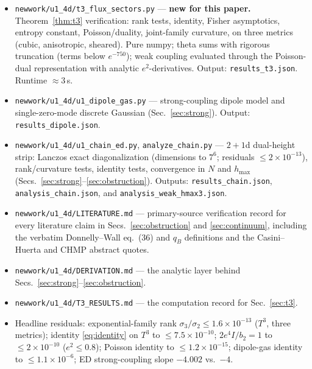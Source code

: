 \documentclass[11pt]{article}
\theoremstyle{remark}
\theoremstyle{plain}
\begin{document}
\begin{itemize}
\item \texttt{newwork/u1\_4d/t3\_flux\_sectors.py} --- \textbf{new for this paper.} Theorem~\ref{thm:t3} verification: rank tests, identity, Fisher asymptotics, entropy constant, Poisson/duality, joint-family curvature, on three metrics (cubic, anisotropic, sheared). Pure numpy; theta sums with rigorous truncation (terms below $e^{-750}$); weak coupling evaluated through the Poisson-dual representation with analytic $e^2$-derivatives. Output: \texttt{results\_t3.json}. Runtime ${\approx}3$\,s.
\item \texttt{newwork/u1\_4d/u1\_dipole\_gas.py} --- strong-coupling dipole model and single-zero-mode discrete Gaussian (Sec.~\ref{sec:strong}). Output: \texttt{results\_dipole.json}.
\item \texttt{newwork/u1\_4d/u1\_chain\_ed.py}, \texttt{analyze\_chain.py} --- $2{+}1$d dual-height strip: Lanczos exact diagonalization (dimensions to $7^6$; residuals $\leq 2\times10^{-13}$), rank/curvature tests, identity tests, convergence in $N$ and $h_{\max}$ (Secs.~\ref{sec:strong}--\ref{sec:obstruction}). Outputs: \texttt{results\_chain.json}, \texttt{analysis\_chain.json}, and \texttt{analysis\_weak\_hmax3.json}.
\item \texttt{newwork/u1\_4d/LITERATURE.md} --- primary-source verification record for every literature claim in Secs.~\ref{sec:obstruction} and \ref{sec:continuum}, including the verbatim Donnelly--Wall eq.~(36) and $q_B$ definitions and the Casini--Huerta and CHMP abstract quotes.
\item \texttt{newwork/u1\_4d/DERIVATION.md} --- the analytic layer behind Secs.~\ref{sec:strong}--\ref{sec:obstruction}.
\item \texttt{newwork/u1\_4d/T3\_RESULTS.md} --- the computation record for Sec.~\ref{sec:t3}.
\item Headline residuals: exponential-family rank $\sigma_3/\sigma_2 \leq 1.6\times10^{-13}$ ($T^3$, three metrics); identity \eqref{eq:identity} on $T^3$ to $\leq 7.5\times10^{-10}$; $2e^4 I/b_2 = 1$ to $\leq 2\times10^{-10}$ ($e^2 \leq 0.8$); Poisson identity to $\leq 1.2\times10^{-15}$; dipole-gas identity to $\leq 1.1\times10^{-6}$; ED strong-coupling slope $-4.002$ vs.\ $-4$.
\end{itemize}
\end{document}
